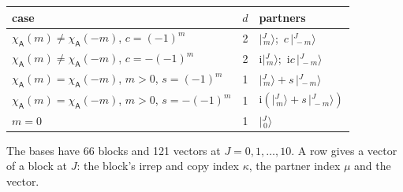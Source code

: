 \documentclass[10pt,a4paper]{article}
\numberwithin{equation}{section}
\newcommand{\grp}[1]{\mathsf{#1}}
\newcommand{\iunit}{\mathrm{i}}
\newcommand{\chiA}{\chi_{\grp{A}}}
\newcommand{\mult}{\kappa}
\newcommand{\intx}{\mu}
\newcommand{\jm}[2]{\bigl\lvert{}^{#1}_{\,#2}\bigr\rangle}
\begin{document}
\begin{center}\begin{tabular}{@{}lrl@{}}\toprule
case & $d$ & partners\\\midrule
$\chiA(m) \ne \chiA(-m)$, $c = (-1)^m$ & 2 & $\jm{J}{m}$;\ $c\,\jm{J}{-m}$\\
$\chiA(m) \ne \chiA(-m)$, $c = -(-1)^m$ & 2 & $\iunit\jm{J}{m}$;\ $\iunit c\,\jm{J}{-m}$\\
$\chiA(m) = \chiA(-m)$, $m > 0$, $s = (-1)^m$ & 1 & $\jm{J}{m} + s\,\jm{J}{-m}$\\
$\chiA(m) = \chiA(-m)$, $m > 0$, $s = -(-1)^m$ & 1 & $\iunit(\jm{J}{m} + s\,\jm{J}{-m})$\\
$m = 0$ & 1 & $\jm{J}{0}$\\
\bottomrule\end{tabular}\end{center}
The bases have 66 blocks and 121 vectors at $J = 0, 1, \dots, 10$. \label{n:head.vector}A row gives a vector of a block at $J$: the block's irrep and copy index $\mult$, the partner index $\intx$ and the vector.
\end{document}
